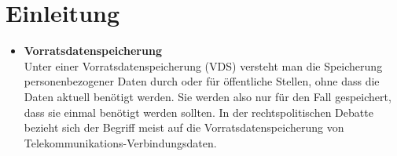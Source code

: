 
\section{Einleitung}
  \begin{frame}
    \begin{itemize}
      \item \textbf{Vorratsdatenspeicherung}\\
        Unter einer Vorratsdatenspeicherung (VDS) versteht man die Speicherung personenbezogener Daten durch oder für öffentliche Stellen, ohne dass die Daten aktuell benötigt werden. Sie werden also nur für den Fall gespeichert, dass sie einmal benötigt werden sollten. In der rechtspolitischen Debatte bezieht sich der Begriff meist auf die Vorratsdatenspeicherung von Telekommunikations-Verbindungsdaten.
    \end{itemize}
  \end{frame}
